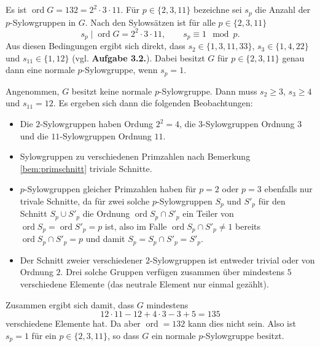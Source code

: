 \documentclass[a4paper,10pt]{article}
\theoremstyle{definition}
\newcommand{\ord}{\operatorname{ord}}
\begin{document}
\section{}
Es ist $\ord G = 132 = 2^2 \cdot 3 \cdot 11$.  Für $p \in \{2,3,11\}$ bezeichne sei $s_p$ die Anzahl der $p$-Sylowgruppen in $G$. Nach den Sylowsätzen ist für alle $p \in \{2,3,11\}$
\[
 s_p \mid \ord G = 2^2 \cdot 3 \cdot 11, \qquad s_p \equiv 1 \mod p.
\]
Aus diesen Bedingungen ergibt sich direkt, dass $s_2 \in \{1,3,11,33\}$, $s_3 \in \{1,4,22\}$ und $s_{11} \in \{1,12\}$ (vgl. \textbf{Aufgabe 3.2.}). Dabei besitzt $G$ für $p \in \{2,3,11\}$ genau dann eine normale $p$-Sylowgruppe, wenn $s_p = 1$.

Angenommen, $G$ besitzt keine normale $p$-Sylowgruppe. Dann muss $s_2 \geq 3$, $s_3 \geq 4$ und $s_{11} = 12$. Es ergeben sich dann die folgenden Beobachtungen:
\begin{itemize}
 \item Die $2$-Sylowgruppen haben Ordung $2^2=4$, die $3$-Sylowgruppen Ordnung $3$ und die $11$-Sylowgruppen Ordnung $11$.
 \item Sylowgruppen zu verschiedenen Primzahlen nach Bemerkung \ref{bem:primschnitt} triviale Schnitte.
 \item $p$-Sylowgruppen gleicher Primzahlen haben für $p = 2$ oder $p = 3$ ebenfalls nur trivale Schnitte, da für zwei solche $p$-Sylowgruppen $S_p$ und $S'_p$ für den Schnitt $S_p \cup S'_p$ die Ordnung $\ord S_p \cap S'_p$ ein Teiler von $\ord S_p = \ord S'_p = p$ ist, also im Falle $\ord S_p \cap S'_p \neq 1$ bereits $\ord S_p \cap S'_p = p$ und damit $S_p = S_p \cap S'_p = S'_p$.
 \item Der Schnitt zweier verschiedener $2$-Sylowgruppen ist entweder trivial oder von Ordnung $2$. Drei solche Gruppen verfügen zusammen über mindestens $5$ verschiedene Elemente (das neutrale Element nur einmal gezählt).
\end{itemize}
Zusammen ergibt sich damit, dass $G$ mindestens
\[
 12 \cdot 11 - 12 + 4 \cdot 3 - 3 + 5 = 135
\]
verschiedene Elemente hat. Da aber $\ord = 132$ kann dies nicht sein. Also ist $s_p = 1$ für ein $p \in \{2,3,11\}$, so dass $G$ ein normale $p$-Sylowgruppe besitzt.


 
\end{document}
